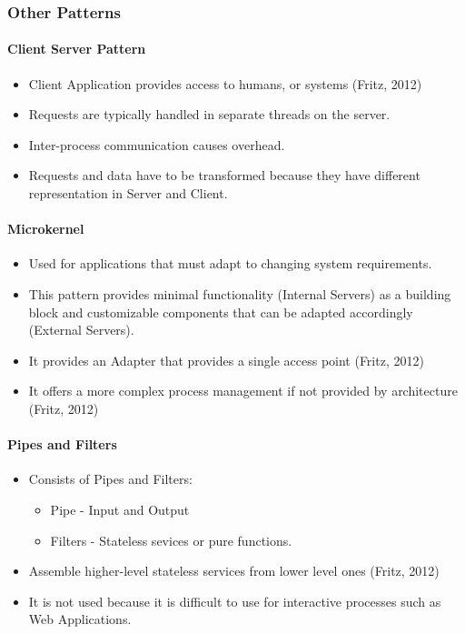 \documentclass{article}
\begin{document}
	\subsubsection{Other Patterns}
		\paragraph{Client Server Pattern}
		
		\begin{itemize}

\item Client Application provides access to humans, or systems (Fritz, 2012)
\item Requests are typically handled in separate threads on the server.
\item Inter-process communication causes overhead.
\item Requests and data have to be transformed because they have different representation in Server and Client.
\end{itemize}

\paragraph{Microkernel}
\begin{itemize}
\item Used for applications that must adapt to changing system requirements.
\item This pattern provides minimal functionality (Internal Servers) as a building block and customizable components that can be adapted accordingly (External Servers).
\item It provides an Adapter that provides a single access point (Fritz, 2012)
\item It offers a more complex process management if not provided by architecture (Fritz, 2012)
\end{itemize}

\paragraph{Pipes and Filters}
\begin{itemize}
\item Consists of Pipes and Filters:
\begin{itemize}
\item Pipe - Input and Output
\item Filters - Stateless sevices or pure functions.
\end{itemize}
\item Assemble higher-level stateless services from lower level ones (Fritz, 2012)
\item It is not used because it is difficult to use for interactive processes such as Web Applications.

\end{itemize}
\end{document}
